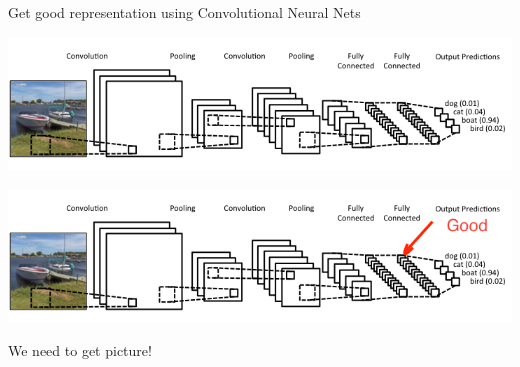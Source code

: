 \documentclass{beamer}
\begin{document}
\begin{frame}{Get good representation using Convolutional Neural Nets}
	\begin{center}
		\includegraphics[scale=0.4]{img/cnn}
		
		\includegraphics[scale=0.4]{img/cnn_gr}
	\end{center}
	
	\begin{tcolorbox}[colback=gray!2, colframe=red!90, title=Issue]
		\centering We need to get picture!
	\end{tcolorbox}
\end{frame}
\end{document}
